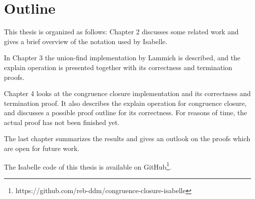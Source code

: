 \section{Outline}
This thesis is organized as follows: Chapter 2 discusses some related work and gives a brief overview of the notation used by Isabelle.

In Chapter 3 the union-find implementation by Lammich \cite{unionfind-isabelle} is described, and the explain operation is presented together with its correctness and termination proofs.

Chapter 4 looks at the congruence closure implementation and its correctness and termination proof. It also describes the explain operation for congruence closure, and discusses a possible proof outline for its correctness. For reasons of time, the actual proof has not been finished yet.

The last chapter summarizes the results and gives an outlook on the proofs which are open for future work.

The Isabelle code of this thesis is available on GitHub\footnote{https://github.com/reb-ddm/congruence-closure-isabelle}.



